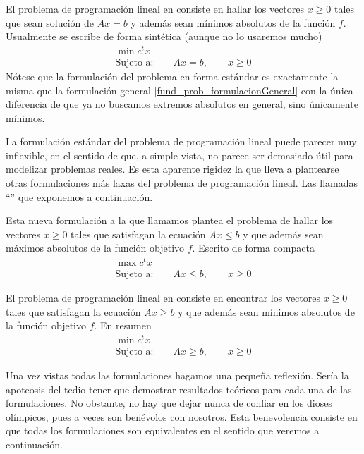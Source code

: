 \begin{prob}
El problema de programación lineal en  consiste en hallar los vectores $x\geq 0$ tales que sean solución de $Ax=b$ y además sean mínimos absolutos de la función $f$. Usualmente se escribe de forma sintética (aunque no lo usaremos mucho)
\begin{equation*}
\begin{array}{c}
\min c^tx\\
\text{Sujeto a:}\qquad Ax=b,\qquad x\geq 0
\end{array}
\end{equation*}
Nótese que la formulación del problema en forma estándar es exactamente la misma que la formulación general \ref{fund_prob_formulacionGeneral} con la única diferencia de que ya no buscamos extremos absolutos en general, sino únicamente mínimos. 
\end{prob}
La formulación estándar del problema de programación lineal puede parecer muy inflexible, en el sentido de que, a simple vista, no parece ser demasiado útil para modelizar problemas reales. Es esta aparente rigidez la que lleva a plantearse otras formulaciones más laxas del problema de programación lineal. Las llamadas ``'' que exponemos a continuación.
\begin{prob}
	Esta nueva formulación a la que llamamos  plantea el problema de hallar los vectores $x\geq 0$ tales que satisfagan la ecuación $Ax\leq b$ y que además sean máximos absolutos de la función objetivo $f$. Escrito de forma compacta
	\begin{equation*}
	\begin{array}{c}
	\max c^tx\\
	\text{Sujeto a:}\qquad Ax\leq b,\qquad x\geq 0
	\end{array}
	\end{equation*}
\end{prob}
\begin{prob}
	El problema de programación lineal en  consiste en encontrar los vectores $x\geq 0$ tales que satisfagan la ecuación $Ax\geq b$ y que además sean mínimos absolutos de la función objetivo $f$. En resumen
	\begin{equation*}
	\begin{array}{c}
	\min c^tx\\
	\text{Sujeto a:}\qquad Ax\geq b,\qquad x\geq 0
	\end{array}
	\end{equation*}
\end{prob}
Una vez vistas todas las formulaciones hagamos una pequeña reflexión. Sería la apoteosis del tedio tener que demostrar resultados teóricos para cada una de las formulaciones. No obstante, no hay que dejar nunca de confiar en los dioses olímpicos, pues a veces son benévolos con nosotros. Esta benevolencia consiste en que todas los formulaciones son equivalentes en el sentido que veremos a continuación.
